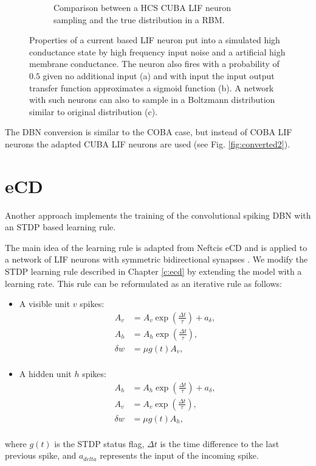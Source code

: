 \begin{figure}
\begin{subfigure}[t]{.5\textwidth}
  		\caption{Comparison between a HCS CUBA LIF neuron sampling and the true distribution in a RBM.}
  		\label{fig:sub2}
	\end{subfigure}
	\caption[Properties of a current based LIF neuron in a high conductance state.]{Properties of a current based LIF neuron put into a simulated high conductance state by high frequency input noise and a artificial high membrane conductance. The neuron also fires with a probability of $0.5$ given no additional input (a) and with input the input output transfer function approximates a sigmoid function (b). A network with such neurons can also to sample in a Boltzmann distribution similar to original distribution (c).}
	\label{fig:cubahcs}
\end{figure}
The DBN conversion is similar to the COBA case, but instead of COBA LIF neurons the adapted CUBA LIF neurons are used (see Fig. \ref{fig:converted2}).

\section{eCD} \label{c:ecdappr}

Another approach implements the training of the convolutional spiking DBN with an STDP based learning rule. 

The main idea of the learning rule is adapted from Neftcis eCD and is applied to a network of LIF neurons with symmetric bidirectional synapses \cite{Neftci2013}.
We modify the STDP learning rule described in Chapter \ref{c:ecd} by extending the model with a learning rate. 
This rule can be reformulated as an iterative rule as follows:
\begin{itemize}
\item A visible unit $v$ spikes: 
\[
\begin{split}
A_v &= A_v \exp(\frac{\Delta t}{\tau}) + a_{\delta} ,\\
A_h &= A_h \exp(\frac{\Delta t}{\tau}) ,\\
\delta w &= \mu g(t)  A_v  ,\\
\end{split}
\]
\item A hidden unit $h$ spikes: 
\[
\begin{split}
A_h &= A_h \exp(\frac{\Delta t}{\tau}) + a_{\delta} ,\\
A_v &= A_v \exp(\frac{\Delta t}{\tau}) ,\\
\delta w &= \mu  g(t) A_h  ,\\
\end{split}
\]
\end{itemize}
where $g(t)$ is the STDP status flag, $\Delta t$ is the time difference to the last previous spike, and $a_{delta}$ represents the input of the incoming spike.


